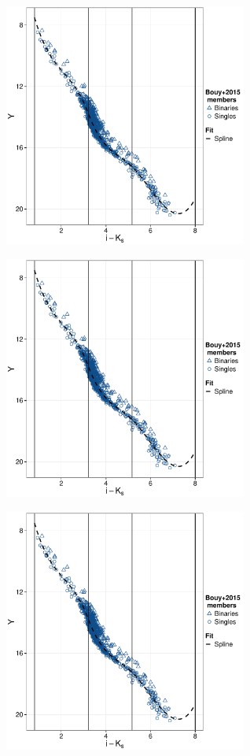 \begin{figure}[ht!]
    \centering
    \begin{subfigure}[t]{0.48\textwidth}
        \includegraphics[page=1,height=8cm,width=\textwidth]{background/Figures/Photometry_fit.pdf}
        \caption{}
        
    \end{subfigure}
    \begin{subfigure}[t]{0.48\textwidth}
      \includegraphics[page=3,height=8cm,width=\textwidth]{background/Figures/Photometry_fit.pdf}
        \caption{}
         
    \end{subfigure}
     \begin{subfigure}[t]{0.48\textwidth}
      \includegraphics[page=5,height=8cm,width=\textwidth]{background/Figures/Photometry_fit.pdf}
        \caption{}
         

\end{subfigure}
\end{figure}
